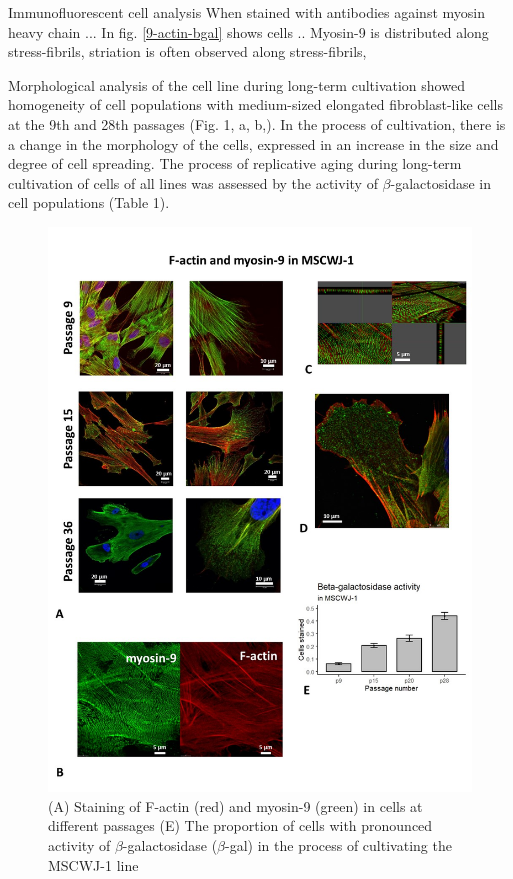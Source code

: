 \documentclass[english,authoryear]{elsarticle}
\begin{document}
Immunofluorescent cell analysis
When stained with antibodies against myosin heavy chain ...
In fig. \ref{9-actin-bgal} shows cells ..
Myosin-9 is distributed along stress-fibrils, striation is often observed along stress-fibrils,


Morphological analysis of the cell line during long-term cultivation showed homogeneity of cell populations with medium-sized elongated fibroblast-like cells at the 9th and 28th passages (Fig. 1, a, b,). In the process of cultivation, there is a change in the morphology of the cells, expressed in an increase in the size and degree of cell spreading.
The process of replicative aging during long-term cultivation of cells of all lines was assessed by the activity of $\beta$-galactosidase in cell populations (Table 1).


\begin{figure}[hbt!]
  \label{m9-actin-bgal}
\centering
\includegraphics[width=0.9\linewidth]{fig_m9-actin-bgal.jpg}
\caption{(A) Staining of F-actin (red) and myosin-9 (green) in cells at different passages (E) The proportion of cells with pronounced activity of $\beta$-galactosidase ($\beta$-gal) in the process of cultivating the MSCWJ-1 line}
\end{figure}
\end{document}
